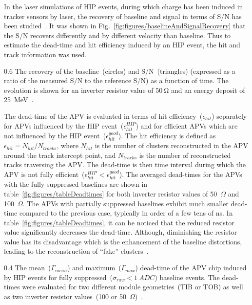 In the laser simulations of HIP events, during which charge has been induced in tracker sensors by laser, the recovery of baseline and signal in terms of S/N has been studied~\cite{Adam:2005pz}. It was shown in Fig.~\ref{fig:figures/baselineAndSignalRecovery} that the S/N recovers differently and by different velocity than baseline. Thus to estimate the dead-time and hit efficiency induced by an HIP event, the hit and track information was used.

                 {0.6}       %
                 {The recovery of the baseline~(circles) and S/N~(triangles) (expressed as a ratio of the measured S/N to the reference S/N) as a function of time. The evolution is shown for an inverter resistor value of $50~\mathrm{\Omega}$ and an energy deposit of 25~MeV~\cite{Adam:2005pz}.} %

The dead-time of the APV is evaluated in terms of hit efficiency~($\epsilon_{hit}$) separately for APVs influenced by the HIP event~($\epsilon_{hit}^{HIP}$) and for efficient APVs which are not influenced by the HIP event~($\epsilon_{hit}^{good}$). The hit efficiency is defined as $\epsilon_{hit} = N_{hit}/N_{tracks}$, where $N_{hit}$ is the number of clusters reconstructed in the APV around the track intercept point, and $N_{tracks}$ is the number of reconstructed tracks traversing the APV. The dead-time is then time interval during which the APV is not fully efficient~($\epsilon_{hit}^{HIP}$ < $\epsilon_{hit}^{good}$). The averaged dead-times for the APVs with the fully suppressed baselines are shown in table~\ref{fig:figures/tableDeadtimes} for both inverter resistor values of 50~$\Omega$ and 100~$\Omega$. The APVs with partially suppressed baselines exhibit much smaller dead-time compared to the previous case, typically in order of a few tens of ns. In table~\ref{fig:figures/tableDeadtimes}, it can be noticed that the reduced resistor value significantly decreases the dead-time. Although, diminishing the resistor value has its disadvantage which is the enhancement of the baseline distortions, leading to the reconstruction of ``fake'' clusters~\cite{Bainbridge:2004jc}.

                 {0.4}       %
                 {The mean~($\Gamma_{mean}$) and maximum~($\Gamma_{max}$) dead-time of the APV chip induced by HIP events for fully suppressed~($\sigma_{raw}<1~ADC$) baseline events. The dead-times were evaluated for two different module geometries~(TIB or TOB) as well as two inverter resistor values~(100 or 50~$\Omega$)~\cite{Bainbridge:2004jc}.} %


